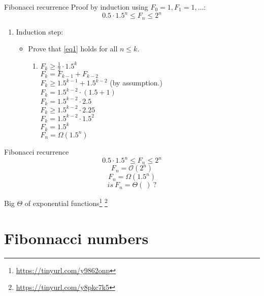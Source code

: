 \documentclass{beamer}
\begin{document}
\begin{frame}{Fibonacci recurrence}
Proof by induction using $F_0 = 1, F_1 = 1, \ldots$:
$$0.5 \cdot 1.5^n \leq F_n \leq 2^n$$
    \begin{enumerate}[3]
        \item Induction step:
        \begin{itemize}
            \item Prove that \eqref{eq1} holds for all $n \leq k$.
            \begin{enumerate}[2)]
             \item $ F_k \geq \frac{1}{2} \cdot 1.5^k $ \\
                $ F_k = F_{k-1} + F_{k-2} $ \\
                $ F_k \geq 1.5^{k-1} + 1.5^{k-2} $ {\scriptsize (by assumption.)} \\
                $ F_k = 1.5^{k-2} \cdot (1.5 + 1) $ \\
                $ F_k = 1.5^{k-2} \cdot 2.5 $ \\
                $ F_k \geq 1.5^{k-2} \cdot 2.25 $ \\
                $ F_k = 1.5^{k-2} \cdot 1.5^2 $ \\
                $ F_k = 1.5^k $ \\
                \vspace{0.3cm}
                $ F_n = \Omega (1.5^n) $
            \end{enumerate}
        \end{itemize}
    \end{enumerate}
\end{frame}

\begin{frame}{Fibonacci recurrence}
    $$ 0.5 \cdot 1.5^n \leq F_n \leq 2^n $$
    \vspace{0.2cm}
    $$ F_n = \mathcal{O}(2^n) $$
    $$ F_n = \Omega (1.5^n) $$
    $$ is \ F_n = \Theta (\ ) \ ? $$
    \vspace{0.5cm}
    \begin{flushright}
        \small Big $\Theta$ of exponential functions\footnote{\url{https://tinyurl.com/y9862onp}} \footnote{\url{https://tinyurl.com/y8pkc7k5}}
    \end{flushright}
\end{frame}

\section{Fibonnacci numbers}
\end{document}
